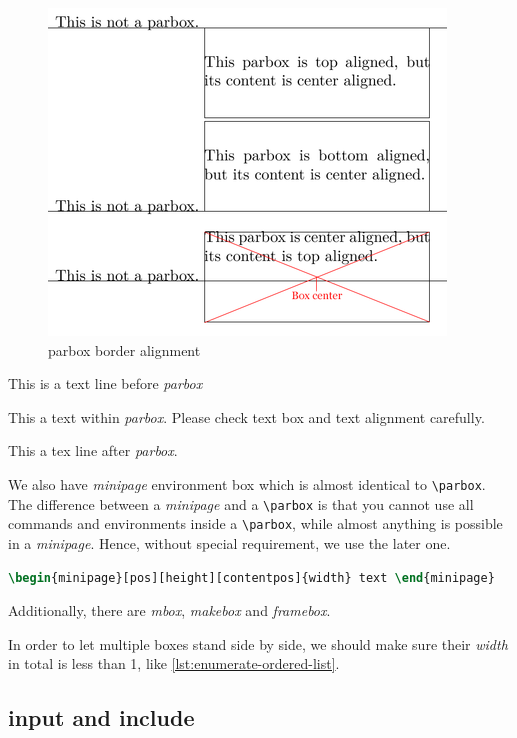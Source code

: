 \begin{figure}[!htbp]
  \centering
  \includegraphics{parbox_border_alignment}
  \caption{parbox border alignment}
  \label{fig:parbox-border-alignment}
\end{figure}

This is a text line before \textit{parbox}
\parbox[t][2cm][b]{5cm}{This a text within \textit{parbox}. Please
  check text box and text alignment carefully.} This a tex line
after \textit{parbox}.

We also have \textit{minipage} environment box which is almost
identical to \verb|\parbox|. The difference between a
\textit{minipage} and a \verb|\parbox| is that you cannot use all
commands and environments inside a \verb|\parbox|, while almost
anything is possible in a \textit{minipage}. Hence, without
special requirement, we use the later one.

\begin{lstlisting}[language=TeX,caption={minipage box},label={lst:minipage-box}]
\begin{minipage}[pos][height][contentpos]{width} text \end{minipage}
\end{lstlisting}

Additionally, there are \textit{mbox}, \textit{makebox} and
\textit{framebox}.

In order to let multiple boxes stand side by side, we should make
sure their \textit{width} in total is less than 1, like
\ref{lst:enumerate-ordered-list}.

\subsection{input and include}
\label{sec:input-include}


